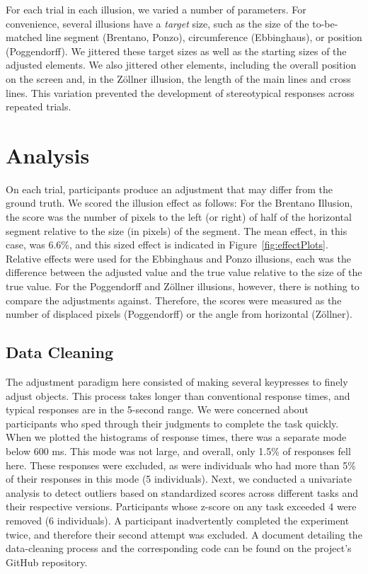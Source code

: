 \documentclass[man, 12pt]{apa7} %
\begin{document}
For each trial in each illusion, we varied a number of parameters. For convenience, several illusions have a \textit{target} size, such as the size of the to-be-matched line segment (Brentano, Ponzo), circumference (Ebbinghaus), or position (Poggendorff). We jittered these target sizes as well as the starting sizes of the adjusted elements. We also jittered other elements, including the overall position on the screen and, in the Zöllner illusion, the length of the main lines and cross lines. This variation prevented the development of stereotypical responses across repeated trials.


\section{Analysis}

On each trial, participants produce an adjustment that may differ from the ground truth. We scored the illusion effect as follows: For the Brentano Illusion, the score was the number of pixels to the left (or right) of half of the horizontal segment relative to the size (in pixels) of the segment. The mean effect, in this case, was 6.6\%, and this sized effect is indicated in Figure~\ref{fig:effectPlots}. Relative effects were used for the Ebbinghaus and Ponzo illusions, each was the difference between the adjusted value and the true value relative to the size of the true value. For the Poggendorff and Zöllner illusions, however, there is nothing to compare the adjustments against. Therefore, the scores were measured as the number of displaced pixels (Poggendorff) or the angle from horizontal (Zöllner).


\subsection{Data Cleaning}

The adjustment paradigm here consisted of making several keypresses to finely adjust objects. This process takes longer than conventional response times, and typical responses are in the 5-second range. We were concerned about participants who sped through their judgments to complete the task quickly. When we plotted the histograms of response times, there was a separate mode below 600 ms. This mode was not large, and overall, only 1.5\% of responses fell here. These responses were excluded, as were individuals who had more than 5\% of their responses in this mode (5 individuals). Next, we conducted a univariate analysis to detect outliers based on standardized scores across different tasks and their respective versions. Participants whose z-score on any task exceeded 4 were removed (6 individuals). A participant inadvertently completed the experiment twice, and therefore their second attempt was excluded. A document detailing the data-cleaning process and the corresponding code can be found on the project's GitHub repository.
\end{document}
